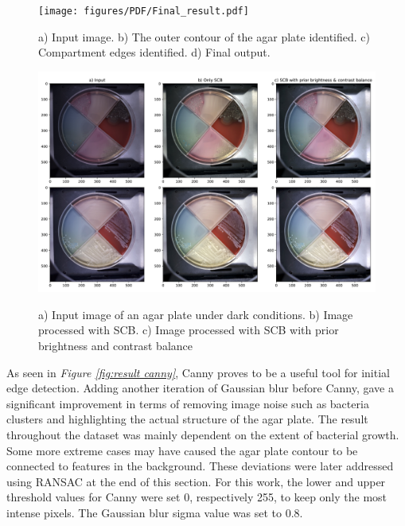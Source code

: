 \begin{figure}[H]
    \centering
     \texttt{[image: figures/PDF/Final\_result.pdf]}
        \caption{a) Input image. b) The outer contour of the agar plate identified. c) Compartment edges identified. d) Final output.}
    \label{fig:result final}
\end{figure}

\begin{figure}[H]
    \centering
    \includegraphics[width=1\linewidth]{figures/PDF/SCB.pdf}\\  
    \caption{a) Input image of an agar plate under dark conditions. b) Image processed with SCB. c) Image processed with SCB with prior brightness and contrast balance  }
    \label{fig:result color balance}
\end{figure}

\noindent As seen in \textit{Figure \ref{fig:result canny}}, Canny proves to be a useful tool for initial edge detection. Adding another iteration of Gaussian blur before Canny, gave a significant improvement in terms of removing image noise such as bacteria clusters and highlighting the actual structure of the agar plate. The result throughout the dataset was mainly dependent on the extent of bacterial growth. Some more extreme cases may have caused the agar plate contour to be connected to features in the background. These deviations were later addressed using RANSAC at the end of this section. For this work, the lower and upper threshold values for Canny were set 0, respectively 255, to keep only the most intense pixels. The Gaussian blur sigma value was set to 0.8. \\

